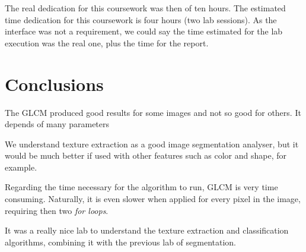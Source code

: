 \documentclass{article}
\begin{document}
The real dedication for this coursework was then of ten hours. The estimated time dedication for this coursework is four hours (two lab sessions).  As the interface was not a requirement, we could say the time estimated for the lab execution was the real one, plus the time for the report.


\section{Conclusions}

The GLCM produced good results for some images and not so good for others. It depends of many parameters

We understand texture extraction as a good image segmentation analyser, but it would be much better if used with other features such as color and shape, for example.

Regarding the time necessary for the algorithm to run, GLCM is very time consuming. Naturally, it is even slower when applied for every pixel in the image, requiring then two \textit{for loops}.

It was a really nice lab to understand the texture extraction and classification algorithms, combining it with the previous lab of segmentation.
\end{document}
